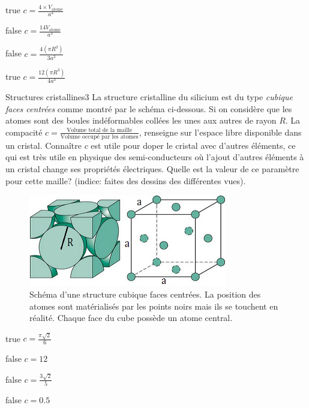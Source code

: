         \begin{reponses} 
            \item[true] $c = \frac{4\times V_\text{atome}}{a^3}$
            \item[false] $c = \frac{14V_\text{atome}}{a^3}$
            \item[false] $c = \frac{4(\pi R^3)}{3a^3}$
    	    \item[true] $c = \frac{12(\pi R^3)}{4a^3}$
        \end{reponses}
        \begin{question}{31}{Structures cristallines}{3}{}
            La structure cristalline du silicium est du type \emph{cubique faces centrées} comme montré par le schéma ci-dessous. Si on considère que les atomes sont des boules indéformables collées les unes aux autres de rayon $R$. La compacité $c = \frac{\text{Volume total de la maille}}{\text{Volume occupé par les atomes}}$, renseigne sur l'espace libre disponible dans un cristal. Connaître $c$ est utile pour doper le cristal avec d'autres éléments, ce qui est très utile en physique des semi-conducteurs où l'ajout d'autres éléments à un cristal change ses propriétés électriques. Quelle est la valeur de ce paramètre pour cette maille? (indice: faites des dessins des différentes vues).
            \begin{figure}
                \centering
                \includegraphics[height = 4cm]{Antoine/Figures_Antoine/FCC.png}
                \caption{Schéma d'une structure cubique faces centrées. La position des atomes sont matérialisés par les points noirs mais ils se touchent en réalité.  Chaque face du cube possède un atome central.}
            \end{figure}
        \end{question}
        \begin{reponses} 
            \item[true] $c = \frac{\pi\sqrt{2}}{6}$
            \item[false] $c = 12$
            \item[false] $c = \frac{3\sqrt{2}}{5}$
    	    \item[false] $c = \num{0.5}$
        \end{reponses}
